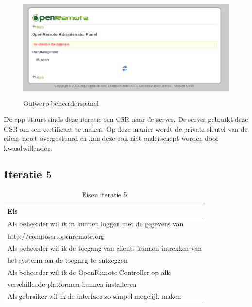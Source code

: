 \documentclass[]{article}
\begin{document}
\begin{figure}[h!]
  \centering
    \includegraphics[height=150pt,keepaspectratio]{adminv1.pdf}
  \caption{Ontwerp beheerderspanel}
  \label{fig:adminv1}
\end{figure}

De app stuurt sinds deze iteratie een CSR naar de server. De server
gebruikt deze CSR om een certificaat te maken. Op deze manier wordt de private
sleutel van de client nooit overgestuurd en kan deze ook niet onderschept
worden door kwaadwillenden.

\subsection{Iteratie 5}
\begin{table}[htpb]
  \caption{Eisen iteratie 5}
  \begin{center}
    \begin{tabular}{|| l ||}\hline
        Eis                                                              \\\hline\hline
        Als beheerder wil ik in kunnen loggen met de gegevens van        \\
        http://composer.openremote.org                                   \\\hline
        Als beheerder wil ik de toegang van clients kunnen intrekken van \\ 
        het systeem om de toegang te ontzeggen                           \\\hline
        Als beheerder wil ik de OpenRemote Controller op alle            \\ 
        verschillende platformen kunnen installeren                      \\\hline
        Als gebruiker wil ik de interface zo simpel mogelijk maken       \\\hline
    \end{tabular}
  \end{center}
\end{table}
\end{document}
